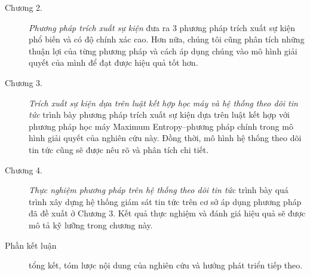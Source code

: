 \begin{preface}
\begin{description}
        \item[Chương 2.] \emph{Phương pháp trích xuất sự kiện} đưa ra
        3 phương pháp trích xuất sự kiện phổ biến và có độ chính xác cao. Hơn
        nữa, chúng tôi cũng phân tích những thuận lợi của từng phương pháp và
        cách áp dụng chúng vào mô hình giải quyết của mình để đạt được hiệu quả
        tốt hơn.

        \item[Chương 3.] \emph{Trích xuất sự kiện dựa trên luật kết hợp học máy
		và hệ thống theo dõi tin tức} trình bày phương pháp trích xuất sự kiện
        dựa trên luật kết hợp với phương pháp học máy Maximum Entropy--phương
        pháp chính trong mô hình giải quyết của nghiên cứu này. Đồng thời, mô
		hình hệ thống theo dõi tin tức cũng sẽ được nêu rõ và phân tích chi
		tiết.

\newpage
\thispagestyle{empty}
        \item[Chương 4.] \emph{Thực nghiệm phương pháp trên hệ thống theo dõi
        tin tức} trình bày quá trình xây dựng hệ thống giám sát tin tức trên cơ
        sở  áp dụng phương pháp đã đề xuất ở Chương 3. Kết quả thực nghiệm và
        đánh giá hiệu quả sẽ được mô tả kỹ lưỡng trong chương này.


		\item[Phần kết luận] tổng kết, tóm lược nội dung của nghiên cứu
	    và hướng phát triển tiếp theo.
	\end{description}

\end{preface}

